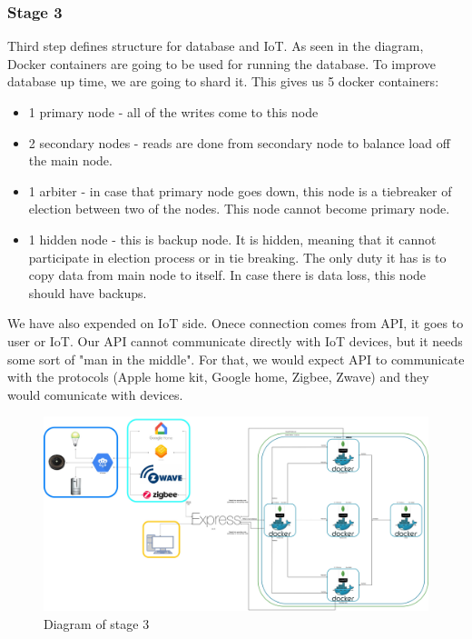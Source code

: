 \subsubsection{Stage 3}
Third step defines structure for database and IoT. As seen in the diagram, Docker containers are going to be used for running the database. To improve database up time, we are going to shard it. 
This gives us 5 docker containers:
\begin{itemize}
  \item 1 primary node - all of the writes come to this node
  \item 2 secondary nodes - reads are done from secondary node to balance load off the main node. 
  \item 1 arbiter - in case that primary node goes down, this node is a tiebreaker of election between two of the nodes. This node cannot become primary node.
  \item 1 hidden node - this is backup node. It is hidden, meaning that it cannot participate in election process or in tie breaking. The only duty it has is to copy data from main node to itself. In case there is data loss, this node should have backups.
\end{itemize}
We have also expended on IoT side. Onece connection comes from API, it goes to user or IoT. Our API cannot communicate directly with IoT devices, but it needs some sort of "man in the middle". For that, we would expect API to communicate with the protocols (Apple home kit, Google home, Zigbee, Zwave) and they would comunicate with devices.
\newline
\begin{figure}[H]
\includegraphics[scale=0.1]{img/systemDiagram-sharded.jpg}
\centering
\caption{Diagram of stage 3}
\end{figure}

